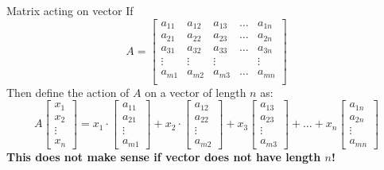 \documentclass{beamer}
\begin{document}
\begin{frame}{Matrix acting on vector}
  If
  \begin{equation*}
      A=\left[
        \begin{array}{ccccc}
          a_{11} & a_{12} & a_{13} & \ldots & a_{1n} \\
          a_{21} & a_{22} & a_{23} & \ldots & a_{2n} \\
          a_{31} & a_{32} & a_{33} & \ldots & a_{3n} \\
          \vdots & \vdots & \vdots & & \vdots \\
          a_{m1} & a_{m2} & a_{m3} & \ldots & a_{mn} \\
        \end{array}
      \right]
    \end{equation*}
  Then define the action of $A$ on a vector of length $n$ as:
  \begin{equation*}
    A\left[\begin{array}{c} x_1 \\ x_2 \\ \vdots \\ x_n\end{array} \right] = x_1\cdot \left[\begin{array}{c} a_{11} \\ a_{21} \\ \vdots \\a_{m1}\end{array} \right]+x_2\cdot \left[\begin{array}{c} a_{12} \\ a_{22} \\ \vdots \\a_{m2}\end{array} \right]+ x_3\left[\begin{array}{c} a_{13} \\ a_{23} \\ \vdots \\a_{m3}\end{array} \right] + \dots + x_n\left[\begin{array}{c} a_{1n} \\ a_{2n} \\ \vdots \\a_{mn}\end{array} \right]
  \end{equation*}
  \bf{This does not make sense if vector does not have length $n$!}
\end{frame}
\end{document}
